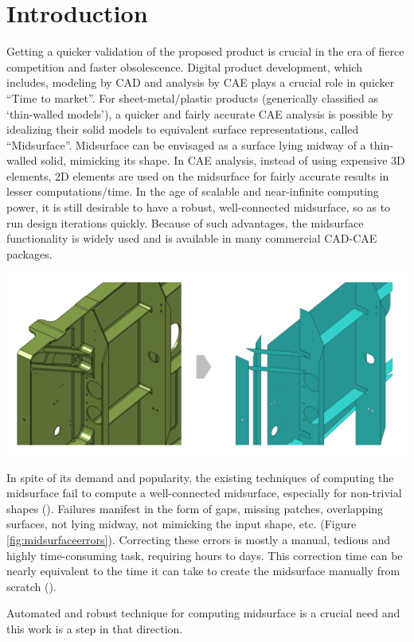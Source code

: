 \section{Introduction}\label{sec:intro}

Getting a quicker validation of the proposed product is crucial in the era of fierce competition and faster obsolescence. Digital product development, which includes, modeling by CAD and analysis by CAE plays a crucial role in quicker ``Time to market''.  For sheet-metal/plastic products (generically classified as `thin-walled models'),  a quicker and fairly accurate CAE analysis is possible by idealizing their solid models to equivalent surface representations, called ``Midsurface''. Midsurface can be envisaged as a surface lying midway of a thin-walled solid, mimicking its shape.   In CAE analysis, instead of using expensive 3D elements, 2D elements are used on the midsurface for fairly accurate results in lesser computations/time.  In the age of scalable and near-infinite computing power, it is still desirable to have  a robust, well-connected midsurface, so as to run design iterations quickly.  Because of such advantages, the midsurface functionality is widely used and is available in many commercial CAD-CAE packages. 

\begin{minipage}[h]{0.98\linewidth} 
\begin{minipage}[h]{0.34\linewidth} 
		\centering
		\includegraphics[width=\linewidth]{..//Common/images/MidsurfaceErrorsMscApex}
		\label{fig:midsurfaceerrors}
\end{minipage}
\hfill
\begin{minipage}[h]{0.64\linewidth} 
In spite of its demand and popularity, the existing techniques of computing the midsurface fail to compute a well-connected midsurface, especially for non-trivial shapes (\cite{ Robinson2006, Stolt2006a,Lockett2008, Woo2013,Automex}). Failures manifest in the form of gaps, missing patches, overlapping surfaces, not lying midway, not mimicking the input shape, etc. (Figure \ref{fig:midsurfaceerrors}). Correcting these errors is mostly a manual, tedious and highly time-consuming task, requiring hours to days. This correction time can be nearly equivalent to the time it can take to create the midsurface manually from scratch (\cite{Stolt2006}). 
\end{minipage}
\end{minipage}



 Automated and  robust technique for computing midsurface  is a crucial need and this work is a step in that direction.

